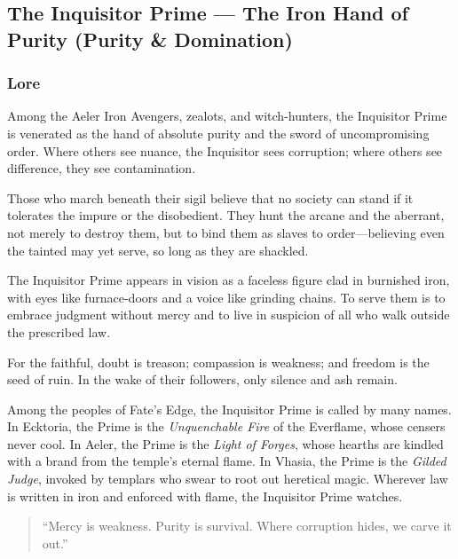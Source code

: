 
\subsection{The Inquisitor Prime --- The Iron Hand of Purity (Purity \& Domination)}

\subsubsection*{Lore}
Among the Aeler Iron Avengers, zealots, and witch-hunters, the Inquisitor Prime is venerated as the hand of absolute purity and the sword of uncompromising order. Where others see nuance, the Inquisitor sees corruption; where others see difference, they see contamination.

Those who march beneath their sigil believe that no society can stand if it tolerates the impure or the disobedient. They hunt the arcane and the aberrant, not merely to destroy them, but to bind them as slaves to order---believing even the tainted may yet serve, so long as they are shackled.

The Inquisitor Prime appears in vision as a faceless figure clad in burnished iron, with eyes like furnace-doors and a voice like grinding chains. To serve them is to embrace judgment without mercy and to live in suspicion of all who walk outside the prescribed law.

For the faithful, doubt is treason; compassion is weakness; and freedom is the seed of ruin. In the wake of their followers, only silence and ash remain.

Among the peoples of Fate's Edge, the Inquisitor Prime is called by many names. In Ecktoria, the Prime is the \textit{Unquenchable Fire} of the Everflame, whose censers never cool. In Aeler, the Prime is the \textit{Light of Forges}, whose hearths are kindled with a brand from the temple's eternal flame. In Vhasia, the Prime is the \textit{Gilded Judge}, invoked by templars who swear to root out heretical magic. Wherever law is written in iron and enforced with flame, the Inquisitor Prime watches.

\begin{quote}
``Mercy is weakness. Purity is survival. Where corruption hides, we carve it out.''
\end{quote}

